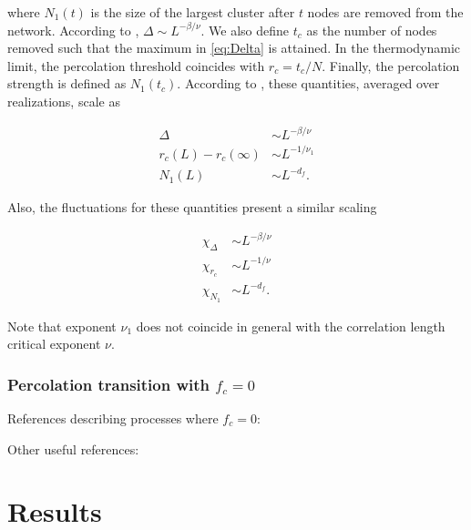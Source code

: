 \documentclass{article}
\begin{document}
where $N_1(t)$ is the size of the largest cluster after $t$ nodes are removed from the network. According to \cite{Fan2020}, $\Delta\sim L^{-\beta/\nu}$. We also define $t_c$ as the number of nodes removed such that the maximum in \ref{eq:Delta} is attained. In the thermodynamic limit, the percolation threshold coincides with $r_c = t_c/N$. Finally, the percolation strength is defined as $N_1(t_c)$. According to \cite{Fan2020}, these quantities, averaged over realizations, scale as 

\begin{align}
\Delta&\sim L^{-\beta/\nu} \\
r_c(L) - r_c(\infty) &\sim L^{-1/\nu_1} \\
N_1(L) &\sim L^{-d_f}.
\end{align}

Also, the fluctuations for these quantities present a similar scaling 

\begin{align}
\chi_{\Delta} &\sim L^{-\beta/\nu} \\
\chi_{r_c} &\sim L^{-1/\nu} \\
\chi_{N_1} &\sim L^{-d_f}.
\end{align}

Note that exponent $\nu_1$ does not coincide in general with the correlation length critical exponent $\nu$.

\subsubsection{Percolation transition with $f_c = 0$}

References describing processes where $f_c = 0$: \cite{Rozenfeld2010Small-worldApproach,Trevelyan2018DegreeInformation,Cho2013AvoidingModels}

Other useful references: \cite{Boettcher2012,Trevelyan2018DegreeInformation,Cho2010}

\section{Results}


\end{document}
